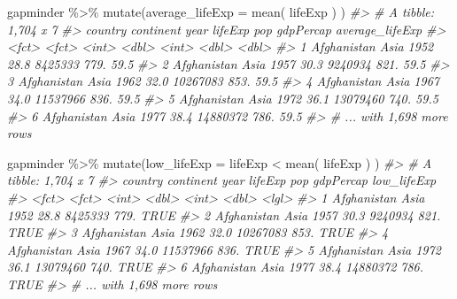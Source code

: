\documentclass[
]{book}
\newenvironment{Shaded}{\begin{snugshade}}{\end{snugshade}}
\newcommand{\AttributeTok}[1]{\textcolor[rgb]{0.77,0.63,0.00}{#1}}
\newcommand{\CommentTok}[1]{\textcolor[rgb]{0.56,0.35,0.01}{\textit{#1}}}
\newcommand{\FunctionTok}[1]{\textcolor[rgb]{0.00,0.00,0.00}{#1}}
\newcommand{\NormalTok}[1]{#1}
\newcommand{\SpecialCharTok}[1]{\textcolor[rgb]{0.00,0.00,0.00}{#1}}
\begin{document}
\begin{Shaded}
\begin{Highlighting}[]
\NormalTok{gapminder }\SpecialCharTok{\%\textgreater{}\%} \FunctionTok{mutate}\NormalTok{(}\AttributeTok{average\_lifeExp =} \FunctionTok{mean}\NormalTok{( lifeExp ) ) }
\CommentTok{\#\textgreater{} \# A tibble: 1,704 x 7}
\CommentTok{\#\textgreater{}   country     continent  year lifeExp      pop gdpPercap average\_lifeExp}
\CommentTok{\#\textgreater{}   \textless{}fct\textgreater{}       \textless{}fct\textgreater{}     \textless{}int\textgreater{}   \textless{}dbl\textgreater{}    \textless{}int\textgreater{}     \textless{}dbl\textgreater{}           \textless{}dbl\textgreater{}}
\CommentTok{\#\textgreater{} 1 Afghanistan Asia       1952    28.8  8425333      779.            59.5}
\CommentTok{\#\textgreater{} 2 Afghanistan Asia       1957    30.3  9240934      821.            59.5}
\CommentTok{\#\textgreater{} 3 Afghanistan Asia       1962    32.0 10267083      853.            59.5}
\CommentTok{\#\textgreater{} 4 Afghanistan Asia       1967    34.0 11537966      836.            59.5}
\CommentTok{\#\textgreater{} 5 Afghanistan Asia       1972    36.1 13079460      740.            59.5}
\CommentTok{\#\textgreater{} 6 Afghanistan Asia       1977    38.4 14880372      786.            59.5}
\CommentTok{\#\textgreater{} \# ... with 1,698 more rows}
\end{Highlighting}
\end{Shaded}

\begin{Shaded}
\begin{Highlighting}[]
\NormalTok{gapminder }\SpecialCharTok{\%\textgreater{}\%} \FunctionTok{mutate}\NormalTok{(}\AttributeTok{low\_lifeExp =}\NormalTok{ lifeExp }\SpecialCharTok{\textless{}} \FunctionTok{mean}\NormalTok{( lifeExp ) )}
\CommentTok{\#\textgreater{} \# A tibble: 1,704 x 7}
\CommentTok{\#\textgreater{}   country     continent  year lifeExp      pop gdpPercap low\_lifeExp}
\CommentTok{\#\textgreater{}   \textless{}fct\textgreater{}       \textless{}fct\textgreater{}     \textless{}int\textgreater{}   \textless{}dbl\textgreater{}    \textless{}int\textgreater{}     \textless{}dbl\textgreater{} \textless{}lgl\textgreater{}      }
\CommentTok{\#\textgreater{} 1 Afghanistan Asia       1952    28.8  8425333      779. TRUE       }
\CommentTok{\#\textgreater{} 2 Afghanistan Asia       1957    30.3  9240934      821. TRUE       }
\CommentTok{\#\textgreater{} 3 Afghanistan Asia       1962    32.0 10267083      853. TRUE       }
\CommentTok{\#\textgreater{} 4 Afghanistan Asia       1967    34.0 11537966      836. TRUE       }
\CommentTok{\#\textgreater{} 5 Afghanistan Asia       1972    36.1 13079460      740. TRUE       }
\CommentTok{\#\textgreater{} 6 Afghanistan Asia       1977    38.4 14880372      786. TRUE       }
\CommentTok{\#\textgreater{} \# ... with 1,698 more rows}
\end{Highlighting}
\end{Shaded}
\end{document}
